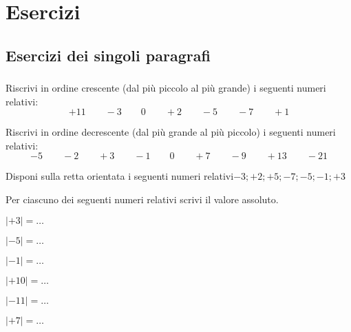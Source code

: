 
\section{Esercizi}

\subsection{Esercizi dei singoli paragrafi}

\subsubsection*{}


\begin{esercizio}
 \label{ese:2.1}
Riscrivi in ordine crescente (dal più piccolo al più grande) i seguenti numeri 
relativi:
\[+11\qquad-3\qquad0\qquad+2\qquad-5\qquad-7\qquad+1\]
\end{esercizio}

\begin{esercizio}
 \label{ese:2.2}
Riscrivi in ordine decrescente (dal più grande al più piccolo) i seguenti numeri 
relativi:
\[-5\qquad-2\qquad+3\qquad-1\qquad0\qquad+7\qquad-9\qquad+13\qquad-21\]
\end{esercizio}

\begin{esercizio}
 \label{ese:2.3}
Disponi sulla retta orientata i seguenti numeri relativi$-3; +2; +5; -7; -5; -1; 
+3$
\begin{center}
 
\end{center}

\end{esercizio}

\begin{esercizio}
 \label{ese:2.4}
Per ciascuno dei seguenti numeri relativi scrivi il valore assoluto.
\begin{multicols}{3}
\begin{enumeratea}
 \item $|+3|=\ldots$
 \item $|-5|=\ldots$
 \item $|-1|=\ldots$
 \item $|+10|=\ldots$
 \item $|-11|=\ldots$
 \item $|+7|=\ldots$
\end{enumeratea}
\end{multicols}
\end{esercizio}


